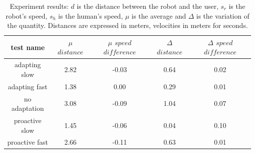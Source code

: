 

\begin{table}
 \vspace{-20pt}
\caption{Experiment results: $d$ is the distance between the robot and the user, $s_r$ is the robot's speed, $s_h$ is the human's speed, $\mu$ is the average and $\Delta$ is the variation of the quantity. Distances are expressed in meters, velocities in meters for seconds.}
\centering
\begin{tabular}{ | c | c | c | c | c | }

\hline
  test name     & $\mu$ $distance$ & $\mu$ $speed$ $difference$ & $\Delta$ $distance$ & $\Delta$ $speed$ $difference$ \\
\hline
adapting slow & 2.82 & -0.03 & 0.64 & 0.02 \\
  \hline
  adapting fast & 1.38 & 0.00 & 0.29 & 0.01 \\
  \hline
  no adaptation & 3.08 & -0.09 & 1.04 & 0.07 \\
\hline
proactive slow & 1.45 & -0.06 & 0.04 & 0.10 \\
\hline
proactive fast & 2.66 & -0.11 & 0.63 & 0.01 \\
\hline
\end{tabular}
\label{table:experiment results}
 \vspace{-20pt}
\end{table}


